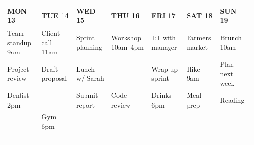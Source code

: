\documentclass[10pt,a4paper]{article}
\begin{document}
\noindent
\begin{minipage}[t]{0.735\linewidth}
  \renewcommand{\arraystretch}{0}
  \begin{tabularx}{\linewidth}{@{}XXXXXXX@{}}
    \cellcolor{accent!12}\footnotesize\bfseries\color{accent} MON 13 &
    \cellcolor{accent!12}\footnotesize\bfseries\color{accent} TUE 14 &
    \cellcolor{todaybg}\footnotesize\bfseries\color{accent} WED 15 &
    \cellcolor{accent!12}\footnotesize\bfseries\color{accent} THU 16 &
    \cellcolor{accent!12}\footnotesize\bfseries\color{accent} FRI 17 &
    \cellcolor{weekend}\footnotesize\bfseries\color{accent} SAT 18 &
    \cellcolor{weekend}\footnotesize\bfseries\color{accent} SUN 19 \\
    \hline
    \footnotesize Team standup 9am &
    \footnotesize Client call 11am &
    \footnotesize Sprint planning &
    \footnotesize Workshop 10am--4pm &
    \footnotesize 1:1 with manager &
    \footnotesize Farmers market &
    \footnotesize Brunch \hfill 10am \\[12mm]
    \hline
    \footnotesize Project review &
    \footnotesize Draft proposal &
    \footnotesize Lunch w/ Sarah &
    \footnotesize{} &
    \footnotesize Wrap up sprint &
    \footnotesize Hike \hfill 9am &
    \footnotesize Plan next week \\[12mm]
    \hline
    \footnotesize Dentist \hfill 2pm &
    \footnotesize{} &
    \footnotesize Submit report &
    \footnotesize Code review &
    \footnotesize Drinks \hfill 6pm &
    \footnotesize Meal prep &
    \footnotesize Reading \\[12mm]
    \hline
    \footnotesize{} & \footnotesize Gym \hfill 6pm & \footnotesize{} & \footnotesize{} & \footnotesize{} & \footnotesize{} & \footnotesize{} \\[12mm]
    \hline
    \footnotesize{} & \footnotesize{} & \footnotesize{} & \footnotesize{} & \footnotesize{} & \footnotesize{} & \footnotesize{} \\[12mm]
    \hline
    \footnotesize{} & \footnotesize{} & \footnotesize{} & \footnotesize{} & \footnotesize{} & \footnotesize{} & \footnotesize{} \\[12mm]
    \hline
    \footnotesize{} & \footnotesize{} & \footnotesize{} & \footnotesize{} & \footnotesize{} & \footnotesize{} & \footnotesize{} \\[12mm]
    \hline
  \end{tabularx}
\end{minipage}%
\end{document}
